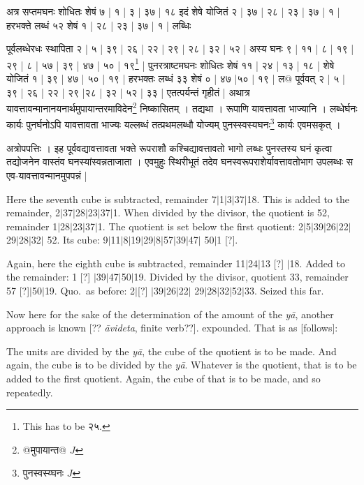 \documentclass[12pt]{book}
\def\ya{\textit{y\=a}}
\def\danda{$|$}
\begin{document}
{\s अत्र सप्तमघनः शोधितः शेषं ७ | १ | ३ | ३७ | १८ इदं शेषे योजितं २ | ३७ | २८ | २३ | ३७ | १ | हरभक्ते लब्धं ५२ शेषं १ | २८ | २३ | ३७ | १ | लब्धिः

पूर्वलब्धेरधः स्थापिता २ | ५ | ३९ | २६ | २२ | २९ | २८ | ३२ | ५२ | अस्य घनः ९ | ११ | ८ | १९ | २९ | ८ | ५७ | ३९ | ४७ | ५० | १९\footnote{This has to be {\s २५}.} | पुनरत्राष्टमघनः शोधितः शेषं ११ | २४ | १३ | १८ |
शेषे योजितं १ | ३९ | ४७ | ५० | १९ | हरभक्तः लब्धं ३३ शेषं ० | ४७ |५० | १९ | 
ल@
पूर्ववत् २ | ५ | ३९ | २६ | २२ | २९ |२८ | ३२ | ५२ | ३३ | एतत्पर्यन्तं गृहीतं | अथात्र यावत्तावन्मानानयनार्थमुपायान्तरमाविदेन\footnote{{\s @मुपायान्त@} $J$} निष्कासितम् । तद्यथा । रूपाणि यावत्तावता भाज्यानि । लब्धेर्घनः कार्यः पुनर्घनोऽपि यावत्तावता भाज्यः यल्लब्धं तत्प्रथमलब्धौ योज्यम् पुनस्स्वस्यघनः\footnote{{\s पुनस्वस्य्घनः} $J$} कार्यः एवमसकृत् । 

अत्रोपपत्तिः ।
इह पूर्ववद्यावत्तावता भक्ते रूपराशौ कश्चिद्यावत्तावतो भागो लब्धः पुनस्तस्य घनं कृत्वा
तद्योजनेन वास्तंव घनस्यांस्वन्नताजाता । एवमुहुः स्थिरीभूतं तदेव घनस्वरूपराशेर्यावत्तावतोभाग उपलब्धः स एव-यावत्तावन्मानमुपपन्नं |}

\newpage


Here the seventh cube is subtracted, remainder 7\danda 1\danda 3\danda 37\danda 18. 
This is added to the remainder, 2\danda 37\danda 28\danda 23\danda 37\danda 1.
When divided by the divisor, the quotient is 52, remainder 
1\danda 28\danda 23\danda 37\danda 1. The quotient 
is set below the first quotient: 2\danda 5\danda 39\danda 26\danda 22\danda 29\danda 28\danda 32\danda
52. Its cube: 9\danda 11\danda 8\danda 19\danda 29\danda 8\danda 57\danda 39\danda 47\danda
50\danda 1 [?]. 

Again, here the eighth cube is subtracted, remainder 11\danda 24\danda 13 [?] \danda 18. Added to the
remainder: 1 [?] \danda 39\danda 47\danda 50\danda 19. Divided by the divisor, quotient 33, 
remainder 57 [?]\danda 50\danda 19. Quo.\ as before: 2\danda [?] \danda 39\danda 26\danda 22\danda
29\danda 28\danda 32\danda 52\danda 33. Seized this far. 

Now here for the sake of the determination of the amount of the \ya, another approach is known 
[?? \textit{\=avideta}, finite verb??]. 
expounded. That is as [follows]: 

The units are divided by the \ya, the cube of the quotient is to be made. And again, the cube is
to be divided by the \ya. Whatever is the quotient, that is to be added to the first quotient. Again,
the cube of that is to be made, and so repeatedly.  
\end{document}
